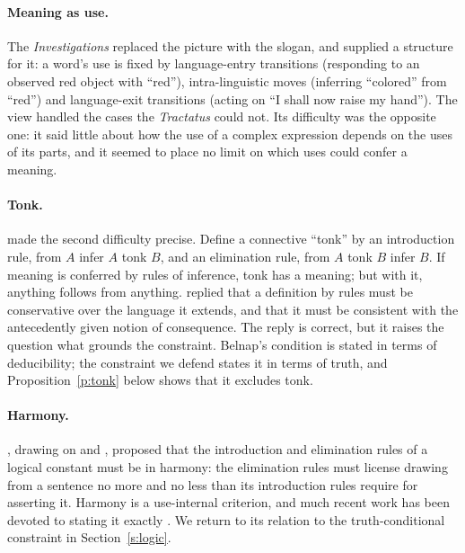 \documentclass{situationist-preprint}
\begin{document}
\paragraph{Meaning as use.} The \emph{Investigations} replaced the picture with the slogan, and \citet{Sellars1954} supplied a structure for it: a word's use is fixed by language-entry transitions (responding to an observed red object with \enquote{red}), intra-linguistic moves (inferring \enquote{colored} from \enquote{red}) and language-exit transitions (acting on \enquote{I shall now raise my hand}). The view handled the cases the \emph{Tractatus} could not. Its difficulty was the opposite one: it said little about how the use of a complex expression depends on the uses of its parts, and it seemed to place no limit on which uses could confer a meaning.

\paragraph{Tonk.} \citet{Prior1960} made the second difficulty precise. Define a connective \enquote{tonk} by an introduction rule, from $A$ infer $A$ tonk $B$, and an elimination rule, from $A$ tonk $B$ infer $B$. If meaning is conferred by rules of inference, tonk has a meaning; but with it, anything follows from anything. \citet{Belnap1962} replied that a definition by rules must be conservative over the language it extends, and that it must be consistent with the antecedently given notion of consequence. The reply is correct, but it raises the question what grounds the constraint. Belnap's condition is stated in terms of deducibility; the constraint we defend states it in terms of truth, and Proposition~\ref{p:tonk} below shows that it excludes tonk.

\paragraph{Harmony.} \citet{Dummett1973,Dummett1991}, drawing on \citet{Gentzen1935} and \citet{Prawitz1965}, proposed that the introduction and elimination rules of a logical constant must be in harmony: the elimination rules must license drawing from a sentence no more and no less than its introduction rules require for asserting it. Harmony is a use-internal criterion, and much recent work has been devoted to stating it exactly \citep{Steinberger2011}. We return to its relation to the truth-conditional constraint in Section~\ref{s:logic}.
\end{document}
